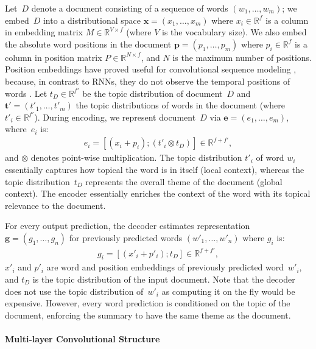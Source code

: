 \documentclass[11pt,a4paper]{article}
\begin{document}
Let~$D$ denote a document consisting of a sequence of words $(w_1,
\ldots, w_m)$; we embed~$D$ into a distributional space $\mathbf{x} =
(x_1, \ldots, x_m)$ where $x_i \in \mathbb{R}^f$ is a column in
embedding matrix $M \in \mathbb{R}^{V\times f}$ (where $V$ is the
vocabulary size). We also embed the absolute word positions in the
document \mbox{$\mathbf{p} = (p_1, \ldots, p_m)$} where $p_i \in
\mathbb{R}^f$ is a column in position matrix $P \in
\mathbb{R}^{N\times f}$, and $N$ is the maximum number of
positions. Position embeddings have proved useful for convolutional
sequence modeling \cite{convseq2seq}, because, in contrast to RNNs,
they do not observe the temporal positions of words
\cite{D16-1248}. Let $t_D \in \mathbb{R}^{f'}$ be the topic
distribution of document~$D$ and $\mathbf{t'} = (t'_1, \ldots, t'_m)$
the topic distributions of words in the document (where $t'_i \in
\mathbb{R}^{f'}$). During encoding, we represent document~$D$ via
$\mathbf{e} = (e_1, \ldots, e_m)$, where~$e_i$ is:
\begin{align}
e_i = [(x_i+p_i);(t'_i\otimes t_D)] \in \mathbb{R}^{f+f'}, \label{eq:encoder}
\end{align}
\noindent and $\otimes$ denotes point-wise multiplication. The topic
distribution $t'_i$ of word $w_i$ essentially captures how topical the
word is in itself (local context), whereas the topic
distribution~$t_D$ represents the overall theme of the document
(global context). The encoder essentially enriches the context of the
word with its topical relevance to the document.


For every output prediction, the decoder estimates representation
$\mathbf{g} = (g_1, \ldots, g_n)$ for previously predicted words
$(w'_1, \ldots, w'_n)$ where $g_i$ is:
\begin{align}
g_i = [(x'_i+p'_i);t_D] \in \mathbb{R}^{f+f'}, \label{eq:decoder}
\end{align}
\noindent $x'_i$ and $p'_i$ are word and position embeddings of
previously predicted word~$w'_i$, and $t_D$ is the topic distribution
of the input document. Note that the decoder does not use the topic
distribution of~$w'_i$ as computing it on the fly would be
expensive. However, every word prediction is conditioned on the topic
of the document, enforcing the summary to have the same theme as the
document.



\paragraph{Multi-layer Convolutional Structure}
\end{document}
